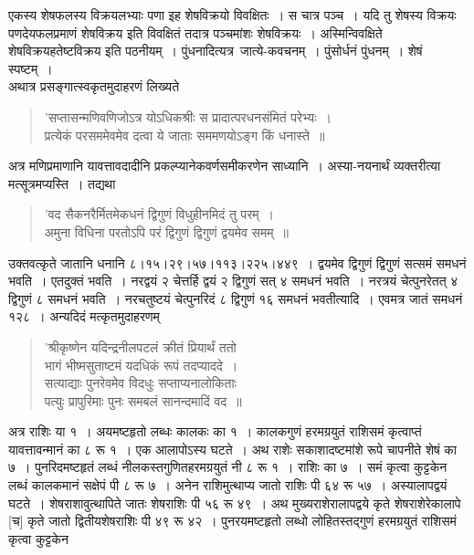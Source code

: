 \documentclass[11pt, openany]{book}
\begin{document}
\newpage

\begin{sloppypar}
एकस्य शेषफलस्य विक्रयलभ्याः पणा इह शेषविक्रयो विवक्षितः~। स चात्र पञ्च~। यदि तु शेषस्य विक्रयः पणदेयफलप्रमाणं शेषविक्रय इति विवक्षितं तदात्र पञ्चमांशः शेषविक्रयः~। अस्मिन्विवक्षिते शेषविक्रयहतेष्टविक्रय इति पठनीयम्~। पुंधनादित्यत्र~जात्ये-कवचनम्~। पुंसोर्धनं पुंधनम्~। शेषं स्पष्टम्~।\\

अथात्र प्रसङ्गात्स्वकृतमुदाहरणं लिख्यते\textendash

\begin{quote}
{\color{violet}'सप्तासन्मणिवणिजोऽत्र योऽधिकश्रीः स प्रादात्परधनसंमितं परेभ्यः~।\\
प्रत्येकं परसममेवमेव दत्वा ये जाताः सममणयोऽङ्ग किं धनास्ते~॥}
\end{quote}

अत्र मणिप्रमाणानि यावत्तावदादीनि प्रकल्प्यानेकवर्णसमीकरणेन साध्यानि~। अस्या-नयनार्थं व्यक्तरीत्या मत्सूत्रमप्यस्ति~। तद्यथा\textendash

\begin{quote}
{\color{violet}'वद सैकनरैर्मितमेकधनं द्विगुणं विधुहीनमिदं तु परम्~।\\
अमुना विधिना परतोऽपि परं द्विगुणं द्विगुणं द्वयमेव समम्~॥}
\end{quote}

उक्तवत्कृते जातानि धनानि ८।१५।२९।५७।११३।२२५।४४९~। द्वयमेव द्विगुणं द्विगुणं सत्समं समधनं भवति~। एतदुक्तं भवति~। नरद्वयं २ चेत्तर्हि द्वयं २ द्विगुणं सत् ४ समधनं भवति~। नरत्रयं चेत्पुनरेतत् ४ द्विगुणं ८ समधनं भवति~। नरचतुष्टयं चेत्पुनरिदं ८ द्विगुणं १६ समधनं भवतीत्यादि~। एवमत्र जातं समधनं १२८~। अन्यदिदं मत्कृतमुदाहरणम्\textendash

\begin{quote}
{\color{violet}'श्रीकृष्णेन यदिन्द्रनीलपटलं क्रीतं प्रियार्थं ततो\\
भागं भीष्मसुताष्टमं यदधिकं रूपं तदप्याददे~।\\
सत्याद्याः पुनरेवमेव विदधुः सप्ताप्यनालोकिताः\\
पत्युः प्रापुरिमाः पुनः समबलं सानन्दमादिं वद~॥}
\end{quote}

अत्र राशिः या १~। अयमष्टहृतो लब्धः कालकः का १~। कालकगुणं हरमग्रयुतं राशिसमं कृत्वाप्तं यावत्तावन्मानं का ८ रू १~। एक आलापोऽस्य घटते~। अथ राशेः सकाशादष्टमांशे रूपे चापनीते शेषं का ७~। पुनरिदमष्टहृतं लब्धं नीलकस्तगुणितहरमग्रयुतं नी ८ रू १~। राशिः का ७~। समं कृत्वा कुट्टकेन लब्धं कालकमानं सक्षेपं पी ८ रू ७~। अनेन राशिमुत्थाप्य जातो राशिः पी ६४ रू ५७~। अस्यालापद्वयं घटते~। शेषराशावुत्थापिते जातः शेषराशिः पी ५६ रू ४९~। अथ मुख्यराशेरालापद्वये कृते शेषराशेरेकालापे [च] कृते जातो द्वितीयशेषराशिः पी ४९ रू ४२~। पुनरयमष्टहृतो लब्धो लोहितस्तद्गुणं हरमग्रयुतं राशिसमं कृत्वा कुट्टकेन
\end{sloppypar}
\end{document}
